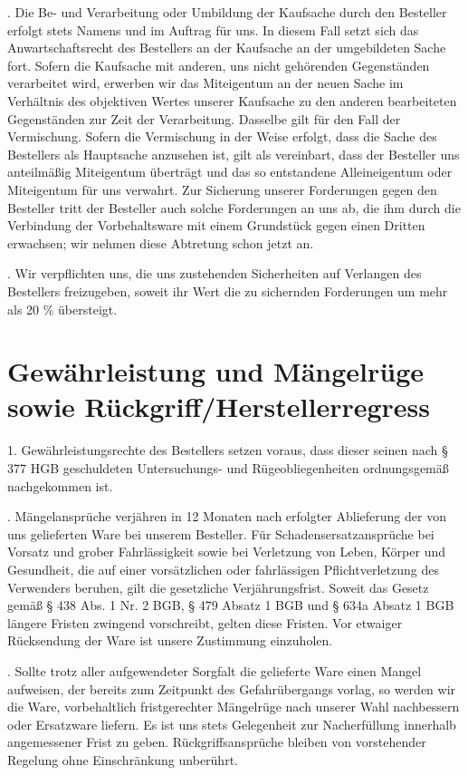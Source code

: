 \documentclass[a4paper, final, 12pt, oneside]{scrartcl}
\numberwithin{equation}{section}
\numberwithin{table}{section}
\numberwithin{figure}{section}
\begin{document}
\begin{multicols}{2}
. Die Be- und Verarbeitung oder Umbildung der Kaufsache durch den Besteller
erfolgt stets Namens und im Auftrag für uns. In diesem Fall setzt sich das
Anwartschaftsrecht des Bestellers an der Kaufsache an der umgebildeten Sache
fort. Sofern die Kaufsache mit anderen, uns nicht gehörenden Gegenständen
verarbeitet wird, erwerben wir das Miteigentum an der neuen Sache im Verhältnis
des objektiven Wertes unserer Kaufsache zu den anderen bearbeiteten
Gegenständen zur Zeit der Verarbeitung. Dasselbe gilt für den Fall der
Vermischung. Sofern die Vermischung in der Weise erfolgt, dass die Sache
des Bestellers als Hauptsache anzusehen ist, gilt als vereinbart, dass der
Besteller uns anteilmäßig Miteigentum überträgt und das so entstandene
Alleineigentum oder Miteigentum für uns verwahrt. Zur Sicherung unserer Forderungen
gegen den Besteller tritt der Besteller auch solche Forderungen an uns ab,
die ihm durch die Verbindung der Vorbehaltsware mit einem Grundstück gegen
einen Dritten erwachsen; wir nehmen diese Abtretung schon jetzt an.

. Wir verpflichten uns, die uns zustehenden Sicherheiten auf Verlangen des
Bestellers freizugeben, soweit ihr Wert die zu sichernden Forderungen um mehr
als 20 \% übersteigt.

\section{Gewährleistung und Mängelrüge sowie Rückgriff/Herstellerregress}
1. Gewährleistungsrechte des Bestellers setzen voraus, dass dieser seinen
nach § 377 HGB geschuldeten Untersuchungs- und Rügeobliegenheiten ordnungsgemäß
nachgekommen ist.

. Mängelansprüche verjähren in 12 Monaten nach erfolgter Ablieferung
der von uns gelieferten Ware bei unserem Besteller. Für Schadensersatzansprüche
bei Vorsatz und grober Fahrlässigkeit sowie bei Verletzung von Leben,
Körper und Gesundheit, die auf einer vorsätzlichen oder fahrlässigen
Pflichtverletzung des Verwenders beruhen, gilt die gesetzliche Verjährungsfrist.
Soweit das Gesetz gemäß § 438 Abs. 1 Nr. 2 BGB, § 479 Absatz 1 BGB und § 634a
Absatz 1 BGB längere Fristen zwingend vorschreibt, gelten diese Fristen. Vor
etwaiger Rücksendung der Ware ist unsere Zustimmung einzuholen.

. Sollte trotz aller aufgewendeter Sorgfalt die gelieferte Ware einen
Mangel aufweisen, der bereits zum Zeitpunkt des Gefahrübergangs vorlag,
so werden wir die Ware, vorbehaltlich fristgerechter Mängelrüge nach unserer
Wahl nachbessern oder Ersatzware liefern. Es ist uns stets Gelegenheit zur
Nacherfüllung innerhalb angemessener Frist zu geben. Rückgriffsansprüche
bleiben von vorstehender Regelung ohne Einschränkung unberührt.


\end{multicols}
\end{document}
